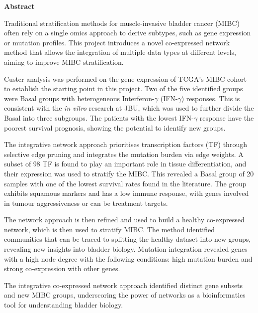 \thispagestyle{plain}
\begin{center}
    \Large        
    \textbf{Abstract}
    \vspace{0.9cm}
\end{center}


Traditional stratification methods for muscle-invasive bladder cancer (MIBC) often rely on a single omics approach to derive subtypes, such as gene expression or mutation profiles. This project introduces a novel co-expressed network method that allows the integration of multiple data types at different levels, aiming to improve MIBC stratification. 

Custer analysis was performed on the gene expression of TCGA's MIBC cohort to establish the starting point in this project. Two of the five identified groups were Basal groups with heterogeneous Interferon-$\gamma$ (IFN-$\gamma$) responses. This is consistent with the \textit{in vitro} research at JBU, which was used to further divide the Basal into three subgroups. The patients with the lowest IFN-$\gamma$ response have the poorest survival prognosis, showing the potential to identify new groups.


% 
The integrative network approach prioritises transcription factors (TF) through selective edge pruning and integrates the mutation burden via edge weights. A subset of 98 TF is found to play an important role in tissue differentiation, and their expression was used to stratify the MIBC. This revealed a Basal group of 20 samples with one of the lowest survival rates found in the literature. The group exhibits squamous markers and has a low immune response, with genes involved in tumour aggressiveness or can be treatment targets.


%
The network approach is then refined and used to build a healthy co-expressed network, which is then used to stratify MIBC. The method identified communities that can be traced to splitting the healthy dataset into new groups, revealing new insights into bladder biology. Mutation integration revealed genes with a high node degree with the following conditions: high mutation burden and strong co-expression with other genes.


The integrative co-expressed network approach identified distinct gene subsets and new MIBC groups, underscoring the power of networks as a bioinformatics tool for understanding bladder biology.


\newpage